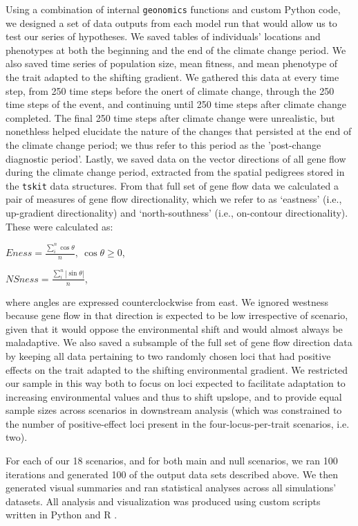 \documentclass[9pt,twocolumn,twoside,lineno]{pnas-new}
\begin{document}
{Using a combination of internal \texttt{geonomics} functions and custom Python code, we 
designed a set of data outputs from each model run that would allow us to test our 
series of hypotheses. We saved tables of individuals’ locations and phenotypes at both
the beginning and the end of the climate change period. We also saved time 
series of population size, mean fitness, and mean phenotype of the trait adapted to 
the shifting gradient. We gathered this data at every time step, from 250 time steps 
before the onert of climate change, through the 250 time steps of the event, and 
continuing until 250 time steps after climate change completed.
The final 250 time steps after climate change were unrealistic, but nonethless helped elucidate
the nature of the changes that persisted at the end of the climate change period;
we thus refer to this period as the 'post-change diagnostic period'.
Lastly, we saved data on the vector directions of all gene flow during the 
climate change period, extracted from the spatial pedigrees stored in the
\texttt{tskit} \cite{kelleher} 
data structures. From that full set of gene flow data we calculated a pair of measures
of gene flow directionality,  which we refer to as ‘eastness’ (i.e., up-gradient 
directionality) and ‘north-southness’ (i.e., on-contour directionality). These were 
calculated as:

$Eness = \frac{\sum\limits_{i}^{n}\cos\theta}{n},\ \cos\theta\geq0$,

$NSness = \frac{\sum\limits_{i}^{n}|\sin\theta|}{n}$,

where angles are expressed counterclockwise from east. We ignored westness because 
gene flow in that direction is expected to be low irrespective 
of scenario, given that it would oppose the environmental shift and would almost 
always be maladaptive. We also saved a subsample of the full set of gene flow 
direction data by keeping all data pertaining to two randomly chosen loci that had 
positive effects on the trait adapted to the shifting environmental gradient. We 
restricted our sample in this way both to focus on loci expected to facilitate 
adaptation to increasing environmental values and thus to shift upslope, and to 
provide equal sample sizes across scenarios in downstream analysis (which was 
constrained to the number of positive-effect loci present in the four-locus-per-trait 
scenarios, i.e. two). 


For each of our 18 scenarios, and for both main and null scenarios, we ran 100 
iterations and generated 100 of the output data sets described above. We then 
generated visual summaries and ran statistical analyses across all simulations’ 
datasets. All analysis and visualization was produced using custom scripts written in 
Python and R \cite{r_core_team}.

}
\end{document}
